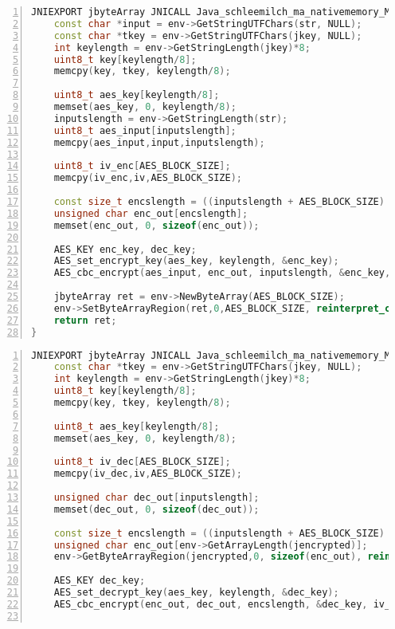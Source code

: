 \begin{appendices}
\begin{lstlisting}[language=C++, caption=AES Encrypt(), label=nkd_aes_encrypt, numbers=left]
JNIEXPORT jbyteArray JNICALL Java_schleemilch_ma_nativememory_MyNDK_encrypt (JNIEnv *env, jobject obj, jstring str, jstring jkey){
    const char *input = env->GetStringUTFChars(str, NULL);
    const char *tkey = env->GetStringUTFChars(jkey, NULL);
    int keylength = env->GetStringLength(jkey)*8;
    uint8_t key[keylength/8];
    memcpy(key, tkey, keylength/8);

    uint8_t aes_key[keylength/8];
    memset(aes_key, 0, keylength/8);
    inputslength = env->GetStringLength(str);
    uint8_t aes_input[inputslength];
    memcpy(aes_input,input,inputslength);

    uint8_t iv_enc[AES_BLOCK_SIZE];
    memcpy(iv_enc,iv,AES_BLOCK_SIZE);

    const size_t encslength = ((inputslength + AES_BLOCK_SIZE) / AES_BLOCK_SIZE) * AES_BLOCK_SIZE;
    unsigned char enc_out[encslength];
    memset(enc_out, 0, sizeof(enc_out));

    AES_KEY enc_key, dec_key;
    AES_set_encrypt_key(aes_key, keylength, &enc_key);
    AES_cbc_encrypt(aes_input, enc_out, inputslength, &enc_key, iv_enc, AES_ENCRYPT);

    jbyteArray ret = env->NewByteArray(AES_BLOCK_SIZE);
    env->SetByteArrayRegion(ret,0,AES_BLOCK_SIZE, reinterpret_cast<jbyte *>(enc_out));
    return ret;
}
\end{lstlisting}
\begin{lstlisting}[language=C++, caption=AES Decrypt(), label=nkd_aes_decrypt,
numbers=left]
JNIEXPORT jbyteArray JNICALL Java_schleemilch_ma_nativememory_MyNDK_decrypt (JNIEnv *env, jobject obj, jbyteArray jencrypted, jstring jkey){
    const char *tkey = env->GetStringUTFChars(jkey, NULL);
    int keylength = env->GetStringLength(jkey)*8;
    uint8_t key[keylength/8];
    memcpy(key, tkey, keylength/8);

    uint8_t aes_key[keylength/8];
    memset(aes_key, 0, keylength/8);

    uint8_t iv_dec[AES_BLOCK_SIZE];
    memcpy(iv_dec,iv,AES_BLOCK_SIZE);

    unsigned char dec_out[inputslength];
    memset(dec_out, 0, sizeof(dec_out));

    const size_t encslength = ((inputslength + AES_BLOCK_SIZE) / AES_BLOCK_SIZE) * AES_BLOCK_SIZE;
    unsigned char enc_out[env->GetArrayLength(jencrypted)];
    env->GetByteArrayRegion(jencrypted,0, sizeof(enc_out), reinterpret_cast<jbyte*>(enc_out));

    AES_KEY dec_key;
    AES_set_decrypt_key(aes_key, keylength, &dec_key);
    AES_cbc_encrypt(enc_out, dec_out, encslength, &dec_key, iv_dec, AES_DECRYPT);


\end{lstlisting}
\end{appendices}
